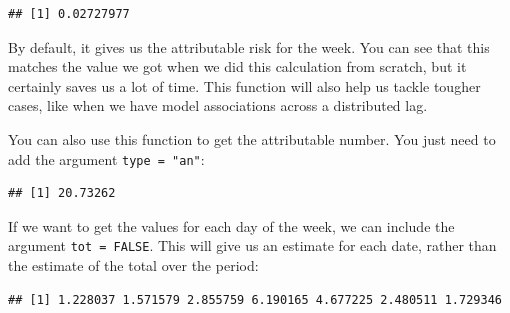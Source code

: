 \documentclass[
]{book}
\newenvironment{Shaded}{\begin{snugshade}}{\end{snugshade}}
\newcommand{\AttributeTok}[1]{\textcolor[rgb]{0.77,0.63,0.00}{#1}}
\newcommand{\ConstantTok}[1]{\textcolor[rgb]{0.00,0.00,0.00}{#1}}
\newcommand{\DecValTok}[1]{\textcolor[rgb]{0.00,0.00,0.81}{#1}}
\newcommand{\FunctionTok}[1]{\textcolor[rgb]{0.00,0.00,0.00}{#1}}
\newcommand{\NormalTok}[1]{#1}
\newcommand{\SpecialCharTok}[1]{\textcolor[rgb]{0.00,0.00,0.00}{#1}}
\newcommand{\StringTok}[1]{\textcolor[rgb]{0.31,0.60,0.02}{#1}}
\begin{document}
\begin{verbatim}
## [1] 0.02727977
\end{verbatim}

By default, it gives us the attributable risk for the week. You can see that this matches the value we got when we did this calculation from scratch, but it certainly saves us a lot of time. This function will also help us tackle tougher cases, like when we have model associations across a distributed lag.

You can also use this function to get the attributable number. You just need to add the argument \texttt{type\ =\ "an"}:

\begin{Shaded}
\end{Shaded}

\begin{verbatim}
## [1] 20.73262
\end{verbatim}

If we want to get the values for each day of the week, we can include the argument \texttt{tot\ =\ FALSE}. This will give us an estimate for each date, rather than the estimate of the total over the period:

\begin{Shaded}
\end{Shaded}

\begin{verbatim}
## [1] 1.228037 1.571579 2.855759 6.190165 4.677225 2.480511 1.729346
\end{verbatim}
\end{document}
